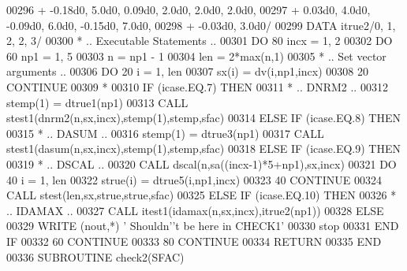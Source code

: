 \begin{DoxyCode}
00296      +                  -0.18d0, 5.0d0, 0.09d0, 2.0d0, 2.0d0, 2.0d0,
00297      +                  0.03d0, 4.0d0, -0.09d0, 6.0d0, -0.15d0, 7.0d0,
00298      +                  -0.03d0, 3.0d0/
00299       \textcolor{keyword}{DATA}              itrue2/0, 1, 2, 2, 3/
00300 \textcolor{comment}{*     .. Executable Statements ..}
00301       \textcolor{keywordflow}{DO} 80 incx = 1, 2
00302          \textcolor{keywordflow}{DO} 60 np1 = 1, 5
00303             n = np1 - 1
00304             len = 2*max(n,1)
00305 \textcolor{comment}{*           .. Set vector arguments ..}
00306             \textcolor{keywordflow}{DO} 20 i = 1, len
00307                sx(i) = dv(i,np1,incx)
00308    20       \textcolor{keywordflow}{CONTINUE}
00309 \textcolor{comment}{*}
00310             \textcolor{keywordflow}{IF} (icase.EQ.7) \textcolor{keywordflow}{THEN}
00311 \textcolor{comment}{*              .. DNRM2 ..}
00312                stemp(1) = dtrue1(np1)
00313                \textcolor{keyword}{CALL }stest1(dnrm2(n,sx,incx),stemp(1),stemp,sfac)
00314             \textcolor{keywordflow}{ELSE} \textcolor{keywordflow}{IF} (icase.EQ.8) \textcolor{keywordflow}{THEN}
00315 \textcolor{comment}{*              .. DASUM ..}
00316                stemp(1) = dtrue3(np1)
00317                \textcolor{keyword}{CALL }stest1(dasum(n,sx,incx),stemp(1),stemp,sfac)
00318             \textcolor{keywordflow}{ELSE} \textcolor{keywordflow}{IF} (icase.EQ.9) \textcolor{keywordflow}{THEN}
00319 \textcolor{comment}{*              .. DSCAL ..}
00320                \textcolor{keyword}{CALL }dscal(n,sa((incx-1)*5+np1),sx,incx)
00321                \textcolor{keywordflow}{DO} 40 i = 1, len
00322                   strue(i) = dtrue5(i,np1,incx)
00323    40          \textcolor{keywordflow}{CONTINUE}
00324                \textcolor{keyword}{CALL }stest(len,sx,strue,strue,sfac)
00325             \textcolor{keywordflow}{ELSE} \textcolor{keywordflow}{IF} (icase.EQ.10) \textcolor{keywordflow}{THEN}
00326 \textcolor{comment}{*              .. IDAMAX ..}
00327                \textcolor{keyword}{CALL }itest1(idamax(n,sx,incx),itrue2(np1))
00328             \textcolor{keywordflow}{ELSE}
00329                \textcolor{keyword}{WRITE} (nout,*) \textcolor{stringliteral}{' Shouldn'}\textcolor{stringliteral}{'t be here in CHECK1'}
00330                stop
00331 \textcolor{keywordflow}{            END IF}
00332    60    \textcolor{keywordflow}{CONTINUE}
00333    80 \textcolor{keywordflow}{CONTINUE}
00334       \textcolor{keywordflow}{RETURN}
00335 \textcolor{keyword}{      END}
00336 \textcolor{keyword}{      SUBROUTINE }check2(SFAC)

\end{DoxyCode}
